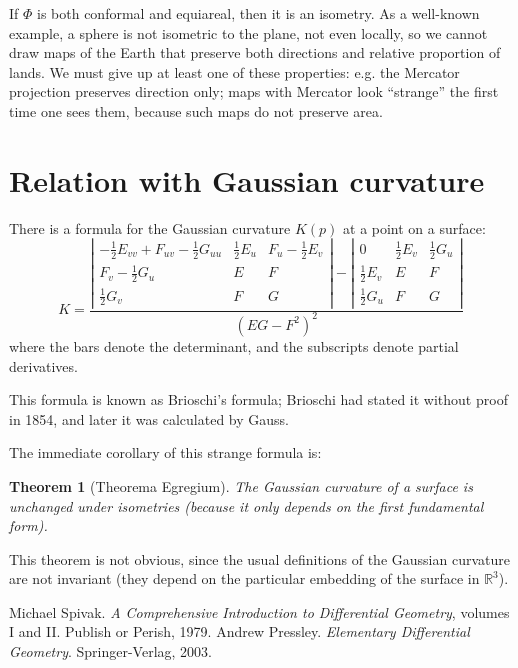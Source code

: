 \documentclass[12pt]{article}
\newcommand{\real}{\mathbb{R}}
\newtheorem{thm*}{Theorem}
\begin{document}
If $\Phi$ is both conformal and equiareal, then it is an isometry.
As a well-known example, a sphere is not isometric to the plane, 
not even locally,
so we cannot draw maps of the Earth that preserve
both directions and relative proportion of lands.
We must give up at least one of these properties:
e.g. the Mercator projection preserves direction only;
maps with Mercator look ``strange'' the first time one sees them, 
because such maps do not preserve area.


\section*{Relation with Gaussian curvature}
There is a formula for the Gaussian curvature $K(p)$ at a point on a surface:
\[
K = \frac{\left\lvert \begin{matrix}
-\frac{1}{2} E_{vv} + F_{uv} - \frac{1}{2} G_{uu} & \frac{1}{2} E_u & F_u - \frac{1}{2} E_v \\
F_v - \frac{1}{2} G_u & E & F \\
\frac{1}{2} G_v & F & G 
\end{matrix}\right\rvert
- \left\lvert \begin{matrix}
0 & \frac{1}{2} E_v & \frac{1}{2} G_u \\
\frac{1}{2} E_v & E & F \\
\frac{1}{2} G_u & F & G
\end{matrix}\right\rvert}{(EG-F^2)^2}
\]
where the bars denote the determinant, and 
the subscripts denote partial derivatives.

This formula is known as Brioschi's formula;
Brioschi had stated it without proof in 1854, and later
it was calculated by Gauss.

The immediate corollary of this strange formula is:
\begin{thm*}[Theorema Egregium]
The Gaussian curvature of a surface is unchanged under isometries
(because it only depends on the first fundamental form).
\end{thm*}

This theorem is not obvious, since the usual definitions 
of the Gaussian curvature
are not invariant 
(they depend on the particular embedding of the surface in $\real^3$).


\begin{thebibliography}{3}
Michael Spivak.  {\it A Comprehensive Introduction to Differential Geometry}, volumes I and II.
 Publish or Perish, 1979.
Andrew Pressley. {\it Elementary Differential Geometry}.  Springer-Verlag, 2003.
\end{thebibliography}

\end{document}
